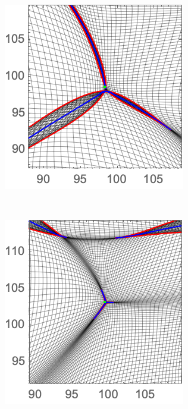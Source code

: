 \documentclass[a4paper, 11pt]{article}
\begin{document}
\begin{figure}
\begin{subfigure}[b]{0.24\textwidth}
\includegraphics[width=\textwidth]{Swallowtail_Z_Zoom}
\end{subfigure}~
\begin{subfigure}[b]{0.24\textwidth}
\includegraphics[width=\textwidth]{Elliptic_Z_Zoom}

\end{subfigure}
\end{figure}
\end{document}
